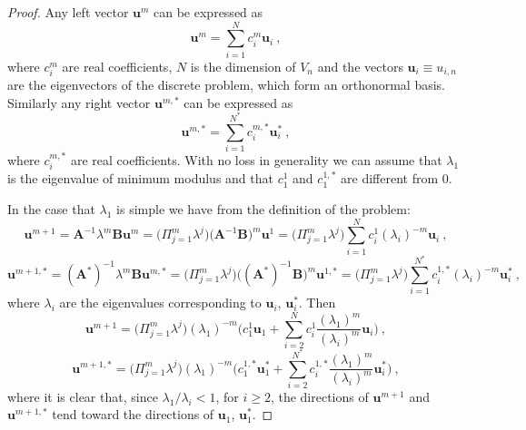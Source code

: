\documentclass[smallextended]{svjour3}
\begin{document}
\begin{proof}

Any left vector $\mathbf{u}^m$ can be expressed as 
$$
\mathbf{u}^m=\sum_{i=1}^N c_i^m \mathbf{u}_i\ ,
$$
where $c_i^m$ are real coefficients, $N$ is the dimension of $V_n$ and the vectors $\mathbf{u}_i\equiv u_{i,n}$ are the eigenvectors of the discrete problem, which form an orthonormal basis.
Similarly any right vector $\mathbf{u}^{m,*}$ can be expressed as 
$$
\mathbf{u}^{m,*}=\sum_{i=1}^{N^*} c_i^{m,*} \mathbf{u}_i^*\ ,
$$
where $c_i^{m,*}$ are real coefficients.
With no loss in generality we can assume that $\lambda_1$ is the eigenvalue of minimum modulus and that $c_1^1$ and $c_1^{1,*}$ are different from 0.

In the case that $\lambda_1$ is simple we have from the definition of the problem:
$$
\mathbf{u}^{m+1}=\mathbf{A}^{-1}\lambda^m\mathbf{B}\mathbf{u}^{m}
=\Big(\Pi_{j=1}^m\lambda^{j}\Big)\Big(\mathbf{A}^{-1}\mathbf{B}\Big)^m\mathbf{u}^1
=\Big(\Pi_{j=1}^m\lambda^{j}\Big)\sum_{i=1}^N c_i^1 (\lambda_i)^{-m}\mathbf{u}_i\ ,
$$
$$
\mathbf{u}^{m+1,*}=(\mathbf{A}^*)^{-1}\lambda^m\mathbf{B}\mathbf{u}^{m,*}
=\Big(\Pi_{j=1}^m\lambda^{j}\Big)\Big((\mathbf{A}^*)^{-1}\mathbf{B}\Big)^m\mathbf{u}^{1,*}
=\Big(\Pi_{j=1}^m\lambda^{j}\Big)\sum_{i=1}^{N^*} c_i^{1,*} (\lambda_i)^{-m}\mathbf{u}_i^*\ ,
$$
where $\lambda_i$ are the eigenvalues corresponding to $\mathbf{u}_i$, $\mathbf{u}_i^*$.
Then
\begin{equation}\label{eq:picard_proof_1}
\mathbf{u}^{m+1}=\Big(\Pi_{j=1}^m\lambda^{j}\Big)(\lambda_1)^{-m}\Big( c_1^1 \mathbf{u}_1 +
\sum_{i=2}^N c_i^1\frac{(\lambda_1)^m}{(\lambda_i)^{m}}\mathbf{u}_i\Big) \ ,
\end{equation}
\begin{equation}\label{eq:picard_proof_2}
\mathbf{u}^{m+1,*}=\Big(\Pi_{j=1}^m\lambda^{j}\Big)(\lambda_1)^{-m}\Big( c_1^{1,*} \mathbf{u}_1^* +
\sum_{i=2}^{N^*} c_i^{1,*}\frac{(\lambda_1)^m}{(\lambda_i)^{m}}\mathbf{u}_i^*\Big) \ ,
\end{equation}
where it is clear that, since $\lambda_1/\lambda_i<1$, for $i\ge 2$, the directions of $\mathbf{u}^{m+1}$ and $\mathbf{u}^{m+1,*}$ tend toward the directions of $\mathbf{u}_1$, $\mathbf{u}_1^*$.


\end{proof}
\end{document}
